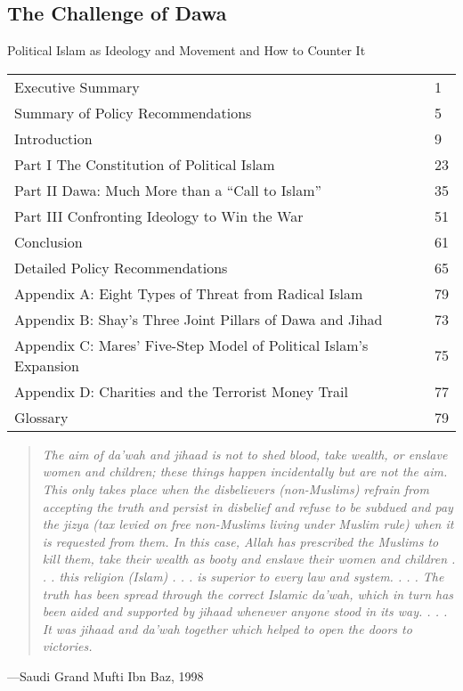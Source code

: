 \documentclass[10pt,titlepage]{book}
\begin{document}
\subsection{The Challenge of Dawa\cite{ali-dawa}}

Political Islam as
Ideology and Movement
and How to Counter It 

\begin{small}
\begin{tabular}{l l}
Executive Summary & 1\\
Summary of Policy Recommendations&5\\
Introduction&9\\
Part I The Constitution of Political Islam&23\\
Part II Dawa: Much More than a “Call to Islam”&35\\
Part III Confronting Ideology to Win the War&51\\
Conclusion&61\\
Detailed Policy Recommendations&65\\
Appendix A: Eight Types of Threat from Radical Islam&79\\
Appendix B: Shay’s Three Joint Pillars of Dawa and Jihad&73\\
Appendix C: Mares’ Five-Step Model of Political Islam’s
Expansion&75\\
Appendix D: Charities and the Terrorist Money Trail&77\\
Glossary&79\\
\end{tabular}
\end{small}

\begin{quote}
{\it
The aim of da’wah and jihaad is not to shed blood, take wealth,
or enslave women and children; these things happen incidentally but are not the aim. This only takes place when the
disbelievers (non-Muslims) refrain from accepting the truth
and persist in disbelief and refuse to be subdued and pay the
jizya (tax levied on free non-Muslims living under Muslim
rule) when it is requested from them. In this case, Allah has
prescribed the Muslims to kill them, take their wealth as booty
and enslave their women and children . . . this religion (Islam)
. . . is superior to every law and system. . . . The truth has been
spread through the correct Islamic da’wah, which in turn has
been aided and supported by jihaad whenever anyone stood in
its way. . . . It was jihaad and da’wah together which helped to
open the doors to victories.
}
\end{quote}
—Saudi Grand Mufti Ibn Baz, 1998
\end{document}
